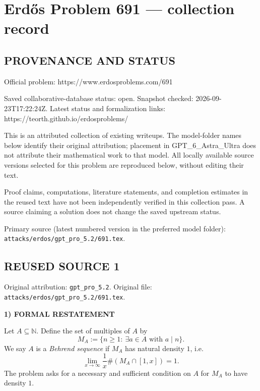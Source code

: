\section*{Erd\H{o}s Problem 691 --- collection record}

\subsection*{PROVENANCE AND STATUS}
Official problem: https://www.erdosproblems.com/691

Saved collaborative-database status: open.
Snapshot checked: 2026-09-23T17:22:24Z.
Latest status and formalization links: https://teorth.github.io/erdosproblems/

This is an attributed collection of existing writeups. The model-folder names below identify their original attribution; placement in GPT\_6\_Astra\_Ultra does not attribute their mathematical work to that model. All locally available source versions selected for this problem are reproduced below, without editing their text.

Proof claims, computations, literature statements, and completion estimates in the reused text have not been independently verified in this collection pass. A source claiming a solution does not change the saved upstream status.

Primary source (latest numbered version in the preferred model folder): \texttt{attacks/erdos/gpt\_pro\_5.2/691.tex}.

\subsection*{REUSED SOURCE 1}
Original attribution: \texttt{gpt\_pro\_5.2}.
Original file: \texttt{attacks/erdos/gpt\_pro\_5.2/691.tex}.


\noindent\textbf{1) FORMAL RESTATEMENT}

Let $A\subseteq\mathbb{N}$. Define the set of multiples of $A$ by
\[
M_A:=\{n\ge 1:\ \exists a\in A\text{ with }a\mid n\}.
\]
We say $A$ is a \emph{Behrend sequence} if $M_A$ has natural density $1$, i.e.
\[
\lim_{x\to\infty}\frac{1}{x}\#(M_A\cap[1,x])=1.
\]
The problem asks for a necessary and sufficient condition on $A$ for $M_A$ to have density $1$.


